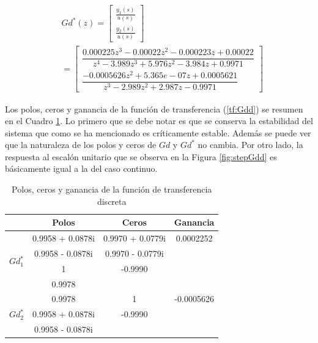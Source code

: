 \documentclass[journal]{IEEEtran}
\begin{document}
\begin{equation}
\label{tf:Gdd}
\begin{aligned}
&Gd^*(z) = \begin{bmatrix}
	\frac{y_1(s)}{u(s)}\\
	\frac{y_2(s)}{u(s)}
\end{bmatrix} \\
& = 
\begin{bmatrix}
\dfrac{0.000225 z^3 - 0.00022 z^2 - 0.000223 z  + 0.00022}{z^4 - 3.989 z^3 + 5.976 z^2 - 3.984 z + 0.9971}\\
\dfrac{ -0.0005626 z^2 + 5.365e-07 z + 0.0005621}{z^3 - 2.989 z^2 + 2.987 z - 0.9971}
\end{bmatrix}
\end{aligned}
\end{equation}
\textbf{}

Los polos, ceros y ganancia de la función de transferencia (\ref{tf:Gdd}) se resumen en el Cuadro \ref{tab: pzg tfdd}. Lo primero que se debe notar es que se conserva la estabilidad del sistema que como se ha mencionado es críticamente estable. Además se puede ver que la naturaleza de los polos y ceros de $Gd$ y $Gd^*$ no cambia. Por otro lado, la respuesta al escalón unitario que se observa en la Figura \ref{fig:stepGdd} es básicamente igual a la del caso continuo.\\

\begin{table}[!h]
\centering
\caption{Polos, ceros y ganancia de la función de transferencia discreta}
\label{tab: pzg tfdd}
\begin{tabular}{@{}lccc@{}}
\toprule
                  & Polos & Ceros             & Ganancia          \\ \midrule
\multirow{4}{*}{$Gd^*_1$} & 0.9958 + 0.0878i &  0.9970 + 0.0779i & 0.0002252 \\
                  & 0.9958 - 0.0878i & 0.9970 - 0.0779i &                   \\
                  & 1 & -0.9990  &                   \\
                  & 0.9978 & &                   \\    
                 \midrule
\multirow{4}{*}{$Gd^*_2$} &  0.9978 & 1 & -0.0005626 \\
                  & 0.9958 + 0.0878i & -0.9990 &                   \\  
                  &  0.9958 - 0.0878i &  &
                  \\ \bottomrule
\end{tabular}
\end{table}
\end{document}
